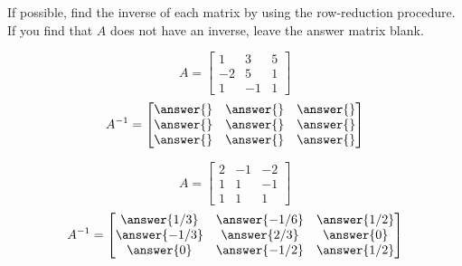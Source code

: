 \documentclass{ximera}
\begin{document}
\begin{problem}
If possible, find the inverse of each matrix by using the row-reduction procedure.  If you find that $A$ does not have an inverse, leave the answer matrix blank.

  \begin{problem}\label{prob:findinverse2}
  $$A=\begin{bmatrix}1&3&5\\-2&5&1\\1&-1&1\end{bmatrix}$$
  $$A^{-1}=\begin{bmatrix}\answer{} &\answer{}&\answer{}\\\answer{}&\answer{}&\answer{}\\\answer{}&\answer{}&\answer{}\end{bmatrix}$$
  
 
 \begin{multipleChoice}
\end{multipleChoice}
  \end{problem}  
  
\begin{problem}\label{prob:findinverse3}
  $$A=\begin{bmatrix}2&-1&-2\\1&1&-1\\1&1&1\end{bmatrix}$$
  $$A^{-1}=\begin{bmatrix}\answer{1/3} & \answer{-1/6} & \answer{1/2} \\  \answer{-1/3} & \answer{2/3} & \answer{0}\\\answer{0} & \answer{-1/2} & \answer{1/2}\end{bmatrix}$$
  
 
 
 \begin{multipleChoice}
\end{multipleChoice}
  \end{problem}   
\end{problem}
\end{document}
